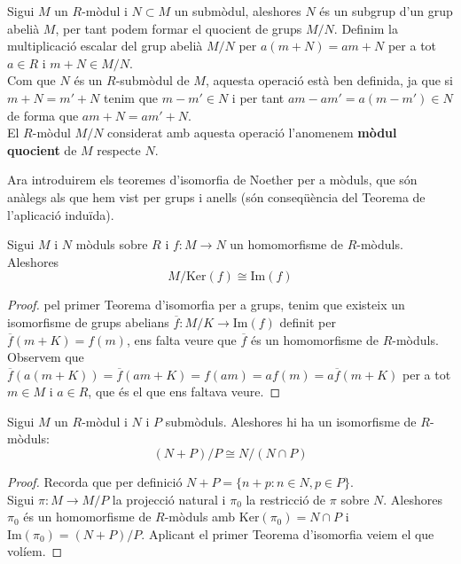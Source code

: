 \begin{definition}
Sigui $M$ un $R$-mòdul i $N\subset M$ un submòdul, aleshores $N$ és un subgrup d'un grup abelià $M$, per tant podem formar el quocient de grups $M/N$. Definim la multiplicació escalar del grup abelià $M/N$ per $a(m+N)=am+N$ per a tot $a\in R$ i $m+N\in M/N$.
\\ 
Com que $N$ és un $R$-submòdul de $M$, aquesta operació està ben definida, ja que si $m+N=m'+N$ tenim que $m-m'\in N$ i per tant $am-am'=a(m-m')\in N$ de forma que $am+N=am'+N$. \\
El $R$-mòdul $M/N$ considerat amb aquesta operació l'anomenem \textbf{mòdul quocient }de $M$ respecte $N$. 
\end{definition}

Ara introduirem els teoremes d'isomorfia de Noether per a
 mòduls, que són anàlegs als que hem vist per grups i anells (són conseqüència del Teorema de l'aplicació induïda).

\begin{theorem}
Sigui $M$ i $N$ mòduls sobre $R$ i $f:M\rightarrow N$ un homomorfisme de $R$-mòduls. Aleshores $$M/\text{Ker}(f)\cong \text{Im}(f)$$
\end{theorem}

\begin{proof}
pel primer Teorema d'isomorfia per a grups, tenim que existeix un isomorfisme de grups abelians $\overline{f}:M/K\rightarrow \text{Im}(f)$ definit per $\overline{f}(m+K)=f(m)$, ens falta veure que $\overline{f}$ és un homomorfisme de $R$-mòduls.  Observem que $\overline{f}(a(m+K))=\overline{f}(am+K)=f(am)=af(m)=a\overline{f}(m+K)$ per a tot $m\in M$ i $a\in R$, que és el que ens faltava veure.
\end{proof}

\begin{theorem} \label{2ntiso}
Sigui $M$ un $R$-mòdul i $N$ i $P$ submòduls. Aleshores hi ha un isomorfisme de $R$-mòduls:
$$
(N+P)/P\cong N/(N\cap P)
$$
\end{theorem}

\begin{proof} Recorda que per definició $N+P=\{n+p : n\in N, p\in P\}$. \\
Sigui $\pi : M\rightarrow M/P$ la projecció natural i $\pi_0$ la restricció de $\pi$ sobre $N$. Aleshores $\pi_0$ és un homomorfisme de $R$-mòduls amb $\text{Ker}(\pi_0)=N\cap P$ i $\text{Im}(\pi_0)=(N+P)/P$. Aplicant el primer Teorema d'isomorfia veiem el que volíem.
\end{proof}

